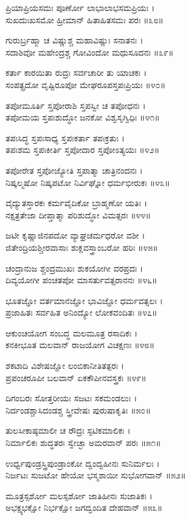 ಪ್ರಿಯಾಪ್ರಿಯಸಮಃ ಪೂರ್ಣೋ ಲಾಭಾಲಾಭಸಮಪ್ರಿಯಃ ।\\
ಸುಖದುಃಖಸಮೋ ಹ್ರೀಮಾನ್ ಹಿತಾಹಿತಸಮಃ ಪರಃ ॥೩೮॥

ಗುರುರ್ಬ್ರಹ್ಮಾ ಚ ವಿಷ್ಣುಶ್ಚ ಮಹಾವಿಷ್ಣುಃ ಸನಾತನಃ ।\\
ಸದಾಶಿವೋ ಮಹೇಂದ್ರಶ್ಚ ಗೋವಿಂದೋ ಮಧುಸೂದನಃ ॥೩೯॥

ಕರ್ತಾ ಕಾರಯಿತಾ ರುದ್ರಃ ಸರ್ವಚಾರೀ ತು ಯಾಚಕಃ ।\\
ಸಂಪತ್ಪ್ರದೋ ವೃಷ್ಟಿರೂಪೋ ಮೇಘರೂಪಸ್ತಪಃಪ್ರಿಯಃ ॥೪೦॥

ತಪೋಮೂರ್ತಿ ಸ್ತಪೋರಾಶಿ ಸ್ತಪಸ್ವೀ ಚ ತಪೋಧನಃ ।\\
ತಪೋಮಯ ಸ್ತಪಃಶುದ್ಧೋ ಜನಕೋ ವಿಶ್ವಸೃಗ್ವಿಧಿಃ ॥೪೧॥

ತಪಃಸಿದ್ಧ ಸ್ತಪಃಸಾಧ್ಯ ಸ್ತಪಃಕರ್ತಾ ತಪಃಕ್ರತುಃ ।\\
ತಪಃಶಮ ಸ್ತಪಃಕೀರ್ತಿ ಸ್ತಪೋದಾರ ಸ್ತಪೋಽತ್ಯಯಃ ॥೪೨॥

ತಪೋರೇತ ಸ್ತಪೋಜ್ಯೋತಿ ಸ್ತಪಾತ್ಮಾ ಚಾತ್ರಿನಂದನಃ ।\\
ನಿಷ್ಕಲ್ಮಷೋ ನಿಷ್ಕಪಟೋ ನಿರ್ವಿಘ್ನೋ ಧರ್ಮಭೀರುಕಃ ॥೪೩॥

ವೈದ್ಯುತಸ್ತಾರಕಃ ಕರ್ಮವೈದಿಕೋ ಬ್ರಾಹ್ಮಣೋ ಯತಿಃ ।\\
ನಕ್ಷತ್ರತೇಜಾ ದೀಪ್ತಾತ್ಮಾ ಪರಿಶುದ್ಧೋ ವಿಮತ್ಸರಃ ॥೪೪॥

ಜಟೀ ಕೃಷ್ಣಾಜಿನಪದೋ ವ್ಯಾಘ್ರಚರ್ಮಧರೋ ವಶೀ ।\\
ಜಿತೇಂದ್ರಿಯಶ್ಚೀರವಾಸಾಃ ಶುಕ್ಲವಸ್ತ್ರಾಂಬರೋ ಹರಿಃ ॥೪೫॥

ಚಂದ್ರಾನುಜ ಶ್ಚಂದ್ರಮುಖಃ ಶುಕಯೋಗೀ ವರಪ್ರದಃ ।\\
ದಿವ್ಯಯೋಗೀ ಪಂಚತಪೋ ಮಾಸರ್ತುವತ್ಸರಾನನಃ ॥೪೬॥

ಭೂತಜ್ಞೋ ವರ್ತಮಾನಜ್ಞೋ ಭಾವಿಜ್ಞೋ ಧರ್ಮವತ್ಸಲಃ ।\\
ಪ್ರಜಾಹಿತಃ ಸರ್ವಹಿತ ಅನಿಂದ್ಯೋ ಲೋಕವಂದಿತಃ ॥೪೭॥

ಆಕುಂಚಯೋಗ ಸಂಬದ್ಧ ಮಲಮೂತ್ರ ರಸಾದಿಕಃ ।\\
ಕನಕೀಭೂತ ಮಲವಾನ್ ರಾಜಯೋಗ ವಿಚಕ್ಷಣಃ ॥೪೮॥

ಶಕಟಾದಿ ವಿಶೇಷಜ್ಞೋ ಲಂಬಿಕಾನೀತಿತತ್ಪರಃ ।\\
ಪ್ರಪಂಚರೂಪೀ ಬಲವಾನ್ ಏಕಕೌಪೀನವಸ್ತ್ರಕಃ ॥೪೯॥

ದಿಗಂಬರಃ ಸೋತ್ತರೀಯಃ ಸಜಟಃ ಸಕಮಂಡಲುಃ ।\\
ನಿರ್ದಂಡಶ್ಚಾಸಿದಂಡಶ್ಚ ಸ್ತ್ರೀವೇಷಃ ಪುರುಷಾಕೃತಿಃ ॥೫೦॥

ತುಲಸೀಕಾಷ್ಠಮಾಲೀ ಚ ರೌದ್ರಃ ಸ್ಫಟಿಕಮಾಲಿಕಃ ।\\
ನಿರ್ಮಾಲಿಕಃ ಶುದ್ಧತರಃ ಸ್ವೇಚ್ಛಾ ಅಮರವಾನ್ ಪರಃ ॥೫೧॥

ಉರ್ಧ್ವಪುಂಡ್ರಸ್ತ್ರಿಪುಂಡ್ರಾಂಕೋ ದ್ವಂದ್ವಹೀನಃ ಸುನಿರ್ಮಲಃ ।\\
ನಿರ್ಜಟಃ ಸುಜಟೋ ಹೇಯೋ ಭಸ್ಮಶಾಯೀ ಸುಭೋಗವಾನ್ ॥೫೨॥

ಮೂತ್ರಸ್ಪರ್ಶೋ ಮಲಸ್ಪರ್ಶೋ ಜಾತಿಹೀನಃ ಸುಜಾತಿಕಃ ।\\
ಅಭಕ್ಷ್ಯಭಕ್ಷೋ ನಿರ್ಭಕ್ಷೋ ಜಗದ್ವಂದಿತ ದೇಹವಾನ್ ॥೫೩॥


